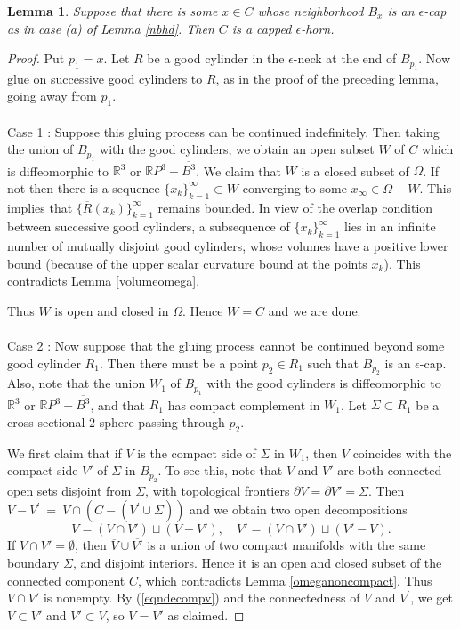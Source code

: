 \documentclass[12pt]{amsart}
\newcommand{\Om}{\Omega}
\newcommand{\R}{{\mathbb R}}
\newcommand{\eps}{\epsilon}
\newcommand{\ol}{\overline}
\newcommand{\Si}{\Sigma}
\numberwithin{equation}{section}
\theoremstyle{plain}
\newtheorem{lemma}[equation]{Lemma}
\theoremstyle{definition}
\theoremstyle{remark}
\begin{document}
\bigskip
\begin{lemma}
Suppose that there is some $x \in C$ whose neighborhood
$B_x$ is an $\epsilon$-cap as in case (a) of Lemma \ref{nbhd}.
Then $C$ is a capped $\epsilon$-horn.
\end{lemma}
\begin{proof}

Put $p_1=x$.  Let $R$ be a good cylinder in the $\eps$-neck
at the end of $B_{p_1}$.  Now glue on successive good cylinders
to $R$,
as in the proof of the preceding lemma,
going away from $p_1$. \\ \\
Case 1 :
Suppose this gluing process can be continued
indefinitely.  Then taking the union of $B_{p_1}$ with 
the good cylinders, we obtain an open subset $W$ of $C$ which
is diffeomorphic to $\R^3$ or $\R P^3-\ol{B^3}$. 
We claim that $W$ is a closed subset of $\Om$.
If not then there is a sequence $\{x_k\}_{k=1}^\infty
\subset W$ converging to some 
$x_\infty\in \Om-W$. This implies that $\{\ol{R}(x_k)\}_{k=1}^\infty$
remains bounded. In view of the overlap condition between successive
good cylinders, a subsequence of
$\{x_k\}_{k=1}^\infty$ lies in an infinite
number of mutually disjoint good cylinders, whose volumes have a positive lower
bound (because of the upper scalar curvature bound at the points $x_k$).
This contradicts Lemma \ref{volumeomega}.

Thus $W$ is open and closed in $\Om$. Hence $W=C$ and 
we are done. \\ \\
Case 2 :
Now suppose that the gluing process cannot be continued beyond some 
good cylinder $R_1$.  Then there must be a point $p_2\in R_1$
such that $B_{p_2}$ is an $\eps$-cap. Also, note that 
the union $W_1$ of $B_{p_1}$ with the good cylinders is diffeomorphic
to $\R^3$ or $\R P^3-\overline{B^3}$, and that $R_1$ has compact
complement in $W_1$.   Let $\Si\subset R_1$ be a cross-sectional $2$-sphere
passing through $p_2$.  

We first claim that if $V$ is the compact side of $\Si$ in $W_1$,
then $V$ coincides with the 
compact side $V'$ of $\Si$ in $B_{p_2}$.  To see this, note that $V$ and $V'$
are both connected open sets disjoint from $\Si$, with topological 
frontiers $\partial V=\partial V'=\Si$.  Then
$V - V^\prime \: = \: V \cap (C - (V^\prime \cup \Sigma))$
and we obtain two
open decompositions
\begin{equation}
\label{eqndecompv}
V=(V\cap V')\sqcup (V-V'),\quad V'=(V\cap V')\sqcup (V'-V).
\end{equation}
If $V\cap V'=\emptyset$, then $\ol{V}\cup\ol{V'}$ is a union of 
two compact manifolds with the same boundary $\Si$, and disjoint interiors.
Hence it is an open
and closed subset of the connected component $C$, which contradicts
Lemma \ref{omeganoncompact}.  Thus $V\cap V'$ is nonempty.
By (\ref{eqndecompv}) and the connectedness of $V$ and $V^\prime$,
we get $V\subset V'$ and $V'\subset V$,
so $V=V'$ as claimed.


\end{proof}
\end{document}
